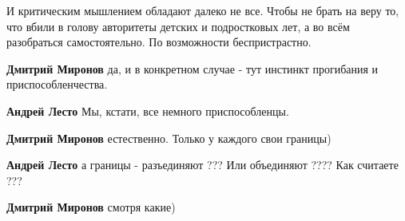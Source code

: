 \begin{itemize}
\begin{itemize}
И критическим мышлением обладают далеко не все. Чтобы не брать на веру то, что
вбили в голову авторитеты детских и подростковых лет, а во всём разобраться
самостоятельно. По возможности беспристрастно.

 
\textbf{Дмитрий Миронов} да, и в конкретном случае - тут инстинкт прогибания и приспособленчества.

 
\textbf{Андрей Лесто} Мы, кстати, все немного приспособленцы.

 
\textbf{Дмитрий Миронов} естественно.
Только у каждого свои границы)

 
\textbf{Андрей Лесто} а границы - разъединяют ??? Или объединяют ???? Как считаете ???

 
\textbf{Дмитрий Миронов} смотря какие)

\end{itemize}

 

\end{itemize}
